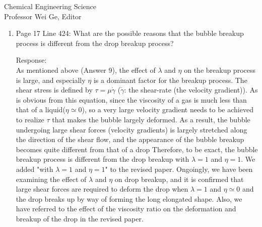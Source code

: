 \documentclass{letter}
\begin{document}
\begin{letter}{
Chemical Engineering Science\\
Professor Wei Ge, Editor\\}
\begin{enumerate}
Response: \\
In the breakup of the drop with $\lambda =1$ and $\eta = 1$ (Fig. 4), the drop starts to break at the center of the drop without 
the elongation in the first place because the drop easily breaks under the low $Re$ number. 
Consequently, the drop breakup is seemingly developed with a bulb-like shape because the liquid bridge between two mother 
drops is formed in the breakup process.
On the other hand, in the case of the bubble, very large shear forces are required to deform the bubble because $\lambda \simeq 0$ 
and $\eta \simeq 0$.
Thus, the bubble undergoing large shear forces is largely stretched along the direction of the shear flow, and the very long 
elongated bubble is finally formed. 
Accordingly, the bubble breaks up without the bulb-like shape. In the revised paper, we added these considerations.\\
\\

\par\noindent
\item
\textsf
{Page 17 Line 424: What are the possible reasons that the bubble breakup process is different from the drop breakup process?}
\vspace{3 mm}

Response: \\
As mentioned above (Answer 9), the effect of $\lambda$ and $\eta$ on the breakup process is large, and especially $\eta$ is 
a dominant factor for the breakup process. 
The shear stress is defined by $\tau = \mu$$\dot{\gamma}$ ($\dot{\gamma}$: the shear-rate (the velocity gradient)).
As is obvious from this equation, since the viscosity of a gas is much less than that of a liquid($\eta \simeq 0$), so a very large velocity 
gradient needs to be achieved to realize $\tau$ that makes the bubble largely deformed.
As a result, the bubble undergoing large shear forces (velocity gradients) is largely stretched along the direction of the shear flow, and
the appearance of the bubble breakup becomes quite different from that of a drop 
Therefore, to be exact, the bubble breakup process is different from the drop breakup with $\lambda = 1$ and $\eta =1$.  
We added "with $\lambda = 1$ and $\eta =1$" to the revised paper.
Ongoingly, we have been examining the effect of $\lambda$ and $\eta$ on drop breakup, and it is confirmed that large shear forces 
are required to deform the drop when $\lambda = 1$ and $\eta \simeq 0$ and the drop breaks up by way of forming the long 
elongated shape. 
Also, we have referred to the effect of the viscosity ratio on the deformation and breakup of the drop in the revised paper.\\
\\


\end{enumerate}
\end{letter}
\end{document}
